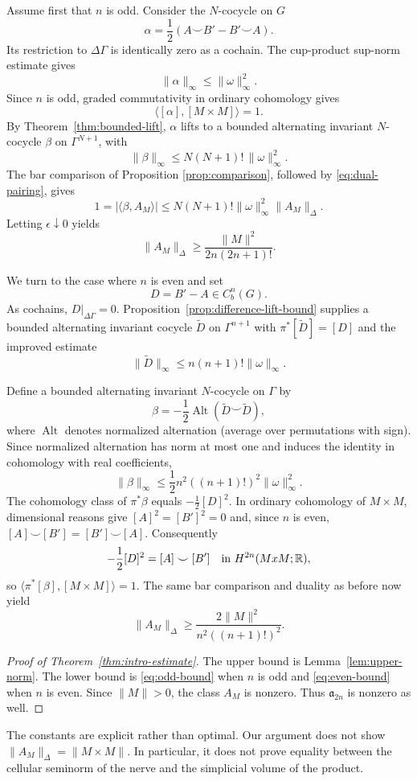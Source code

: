 Assume first that $n$ is odd.
Consider the $N$-cocycle on $G$
\[
 \alpha=\frac12(A\smile B'-B'\smile A).
\]
Its restriction to $\Delta\Gamma$ is identically
zero as a cochain. The cup-product sup-norm
estimate gives
\[
 \|\alpha\|_\infty\leq\|\omega\|_\infty^2.
\]
Since $n$ is odd, graded commutativity
in ordinary cohomology gives
\[
 \langle[\alpha],[M\times M]\rangle=1.
\]
By Theorem~\ref{thm:bounded-lift}, $\alpha$
lifts to a bounded alternating invariant
$N$-cocycle $\beta$ on $\Gamma^{N+1}$, with
\[
 \|\beta\|_\infty
 \leq N(N+1)!\,\|\omega\|_\infty^2.
\]
The bar comparison of Proposition
\ref{prop:comparison}, followed by
\eqref{eq:dual-pairing}, gives
\[
 1=|\langle\beta,A_M\rangle|
 \leq N(N+1)!\|\omega\|_\infty^2
       \|A_M\|_\Delta.
\]
Letting $\epsilon\downarrow0$ yields
\begin{equation}\label{eq:odd-bound}
 \|A_M\|_\Delta\geq
 \frac{\|M\|^2}{2n(2n+1)!}.
\end{equation}

We turn to the case where $n$ is even and set
\[
 D=B'-A\in C_b^n(G).
\]
As cochains, $D|_{\Delta\Gamma}=0$.
Proposition~\ref{prop:difference-lift-bound}
supplies a bounded alternating invariant cocycle
$\widetilde D$ on $\Gamma^{n+1}$ with
$\pi^*[\widetilde D]=[D]$ and the improved estimate
\begin{equation}\label{eq:Dtilde-bound}
 \|\widetilde D\|_\infty
 \leq n(n+1)!\|\omega\|_\infty.
\end{equation}

Define a bounded alternating invariant
$N$-cocycle on $\Gamma$ by
\[
 \beta=-\frac12
 \operatorname{Alt}(\widetilde D\smile\widetilde D),
\]
where $\operatorname{Alt}$ denotes normalized
alternation (average over permutations with
sign). Since normalized alternation has norm
at most one and induces the identity in
cohomology with real coefficients,
\[
 \|\beta\|_\infty
 \leq\frac12 n^2((n+1)!)^2
       \|\omega\|_\infty^2.
\]
The cohomology class of $\pi^*\beta$ equals
$-\frac12[D]^2$. In ordinary cohomology
of $M\times M$, dimensional reasons give
$[A]^2=[B']^2=0$ and, since $n$ is even,
$[A]\smile[B']=[B']\smile[A]$. Consequently
\[
 -\frac12[D]^2=[A]\smile[B']
 \quad\text{in }H^{2n}(Mx M;\mathbb{R}),
\]
so $\langle\pi^*[\beta],[M\times M]\rangle=1$.
The same bar comparison and duality as before
now yield
\begin{equation}\label{eq:even-bound}
 \|A_M\|_\Delta\geq
 \frac{2\|M\|^2}{n^2((n+1)!)^2}.
\end{equation}

\begin{proof}[Proof of Theorem~\ref{thm:intro-estimate}]
The upper bound is Lemma~\ref{lem:upper-norm}.
The lower bound is \eqref{eq:odd-bound}
when $n$ is odd and \eqref{eq:even-bound}
when $n$ is even. Since $\|M\|>0$,
the class $A_M$ is nonzero. Thus
$\mathfrak a_{2n}$ is nonzero as well.
\end{proof}

\begin{remark}
The constants are explicit rather than optimal.
Our argument does not show
$\|A_M\|_\Delta=\|M\times M\|$.
In particular, it does not prove equality
between the cellular seminorm of the nerve
and the simplicial volume of the product.
\end{remark}
